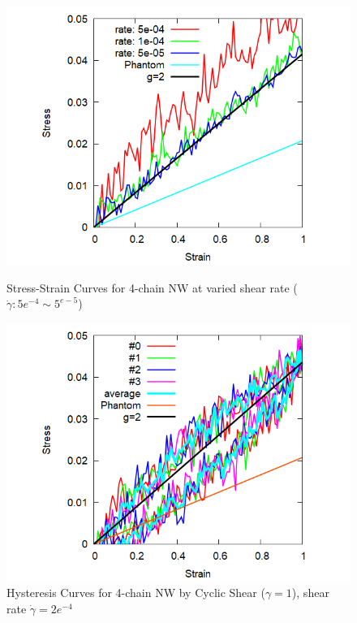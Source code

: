 \documentclass[uplatex,dvipdfmx,a4paper,10pt]{jsarticle}
\begin{document}
\vspace{-1mm}
\begin{figure}[hb]
\begin{minipage}{0.33\hsize}
    \begin{center}
        \includegraphics[width=.9\textwidth]{Shear_Random_4chain_N20_g2.png}
        \caption{Stress-Strain Curves for 4-chain NW at varied shear rate ($\dot{\gamma}: 5e^{-4} \sim 5^{e-5}$)}
        \label{fig:deform}
	\end{center}
\end{minipage}
\begin{minipage}{0.33\hsize}
	\begin{center}
        \includegraphics[width=.9\textwidth]{CyclicDeform_4chain_rate_2e-4_g2.png}
        \caption{Hysteresis Curves for 4-chain NW by Cyclic Shear ($\gamma = 1$), shear rate $\dot{\gamma} = 2e^{-4}$}
        \label{fig:hyst}

\end{center}
\end{minipage}
\end{figure}
\end{document}
